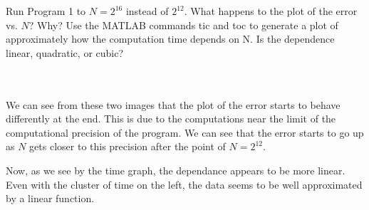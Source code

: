 Run Program 1 to $N=2^{16}$ instead of $2^{12}$. What happens to the plot of the error vs. $N$? Why? Use
the MATLAB commands tic and toc to generate a plot of approximately how the computation time depends on
N. Is the dependence linear, quadratic, or cubic?\\\\

\begin{solution}\renewcommand{\qedsymbol}{}\ \\
    We can see from these two images that the plot of the error starts to behave differently at the end.
    This is due to the computations near the limit of the computational precision of the program. We can
    see that the error starts to go up as $N$ gets closer to this precision after the point of
    $N=2^{12}$.


    Now, as we see by the time graph, the dependance appears to be more linear. Even with the cluster of
    time on the left, the data seems to be well approximated by a linear function.


\end{solution}

\newpage

\newpage
